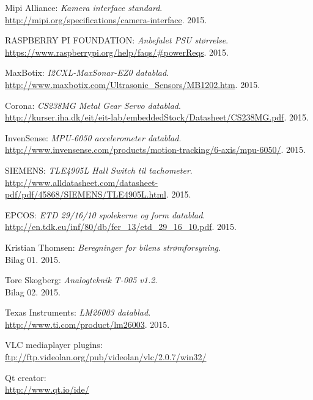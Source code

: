 \renewcommand{\bibname}{Litteraturliste}
\fancyhead[CE,CO]{}
\fancyfoot[CE,CO]{}
\begin{thebibliography}{2}


 Mipi Alliance: \textit{Kamera interface standard}. \\ 
\url{http://mipi.org/specifications/camera-interface}. 2015.

 RASPBERRY PI FOUNDATION: \textit{Anbefalet PSU størrelse}. \\
\url{https://www.raspberrypi.org/help/faqs/#powerReqs}. 2015.

 MaxBotix: \textit{I2CXL-MaxSonar-EZ0 datablad}. \\
\url{http://www.maxbotix.com/Ultrasonic_Sensors/MB1202.htm}. 2015.

 Corona: \textit{CS238MG Metal Gear Servo datablad}. \\
\url{http://kurser.iha.dk/eit/eit-lab/embeddedStock/Datasheet/CS238MG.pdf}. 2015.

 InvenSense: \textit{MPU-6050 accelerometer datablad}. \\
\url{http://www.invensense.com/products/motion-tracking/6-axis/mpu-6050/}. 2015.

 SIEMENS: \textit{TLE4905L Hall Switch til tachometer}. \\
\url{http://www.alldatasheet.com/datasheet-pdf/pdf/45868/SIEMENS/TLE4905L.html}. 2015.

 EPCOS: \textit{ETD 29/16/10 spolekerne og form datablad}. \\
\url{http://en.tdk.eu/inf/80/db/fer_13/etd_29_16_10.pdf}. 2015.

 Kristian Thomsen: \textit{Beregninger for bilens strømforsyning}. \\
Bilag 01. 2015.

 Tore Skogberg: \textit{Analogteknik T-005 v1.2}.\\
Bilag 02. 2015.

 Texas Instruments: \textit{LM26003 datablad}. \\
\url{http://www.ti.com/product/lm26003}. 2015.

 VLC mediaplayer plugins: \\
\url{ftp://ftp.videolan.org/pub/videolan/vlc/2.0.7/win32/}

 Qt creator: \\
\url{http://www.qt.io/ide/}


\end{thebibliography}